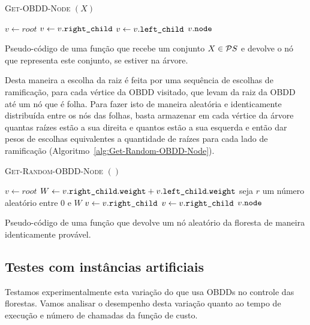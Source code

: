 \begin{algorithm}[]
\textsc{Get-OBDD-Node} $(X)$
\begin{algorithmic}[1]
    \State $v \gets root$
            \State $v \gets v.\texttt{right\_child}$
        \Else
            \State $v \gets v.\texttt{left\_child}$
        \EndIf
    \EndWhile
    \Return $v.\texttt{node}$
\end{algorithmic}
\caption{Pseudo-código de uma função que recebe um conjunto $X \in \mathcal{P}{S}$
e devolve o nó que representa este conjunto, se estiver na árvore.}
\label{alg:Get-OBDD-Node}
\end{algorithm}

Desta maneira a escolha da raiz é feita por uma sequência de escolhas
de ramificação, para cada vértice da OBDD visitado, que levam da raiz
da OBDD até um nó que é folha. Para fazer isto de maneira aleatória e
identicamente distribuída entre os nós das folhas, basta armazenar em
cada vértice da árvore quantas raízes estão a sua direita e quantos 
estão a sua esquerda e então dar pesos de escolhas equivalentes a
quantidade de raízes para cada lado de ramificação (Algoritmo~\ref{alg:Get-Random-OBDD-Node}).

\begin{algorithm}[]
\textsc{Get-Random-OBDD-Node} $()$
\begin{algorithmic}[1]
    \State $v \gets root$
        \State $W \gets v.\texttt{right\_child}.\texttt{weight} + v.\texttt{left\_child}.\texttt{weight}$
        \State seja $r$ um número aleatório entre 0 e $W$
            \State $v \gets v.\texttt{right\_child}$
        \Else
            \State $v \gets v.\texttt{right\_child}$
        \EndIf
    \EndWhile
    \Return $v.\texttt{node}$
\end{algorithmic}
\caption{Pseudo-código de uma função que devolve um nó aleatório da floresta
de maneira identicamente provável.}
\label{alg:Get-Random-OBDD-Node}
\end{algorithm}

\subsection{Testes com instâncias artificiais}
Testamos experimentalmente esta variação do  que usa OBDDs no controle
das florestas. Vamos analisar o desempenho desta variação quanto ao tempo de execução e número de chamadas da função de custo.

